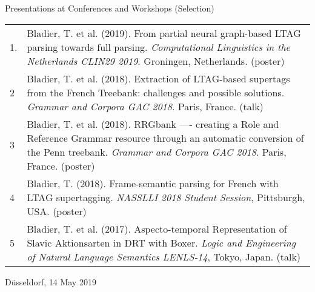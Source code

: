 \documentclass{resume} %
\begin{document}
\smallskip

\begin{rSection}{Presentations at Conferences and Workshops (Selection)}

\hspace{-20pt}
\begin{tabular}{p{0.1cm}p{17cm}}
1. &  Bladier, T. et al. (2019). From partial neural graph-based LTAG parsing towards full parsing.  {\it Computational Linguistics in the Netherlands CLIN29 2019}. Groningen, Netherlands. (poster)  \\[5pt]
 2 &  Bladier, T.  et al. (2018). Extraction of LTAG-based supertags from the French Treebank: challenges and possible solutions. {\it Grammar and Corpora GAC 2018}. Paris, France. (talk)\\[5pt]
 3 & Bladier, T. et al. (2018).  RRGbank —- creating a Role and Reference Grammar resource through an automatic conversion of the Penn treebank. {\it Grammar and Corpora GAC 2018}. Paris, France. (poster) \\[5pt]
 4 &  Bladier, T. (2018). Frame-semantic parsing for French with LTAG supertagging. {\it NASSLLI 2018 Student Session}, Pittsburgh, USA. (poster) \\[5pt] 
 5 &  Bladier, T. et al. (2017). Aspecto-temporal Representation of Slavic Aktionsarten in DRT with Boxer. {\it  Logic and Engineering of Natural Language Semantics LENLS-14}, Tokyo, Japan. (talk)
\end{tabular}

\end{rSection}



\vspace{12pt}

D{\"u}sseldorf, 14 May 2019
\end{document}
